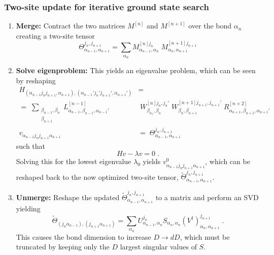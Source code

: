 \subsubsection{Two-site update for iterative ground state search}
\begin{enumerate}
\item
\textbf{Merge:} Contract the two matrices $M^{[n]}$ and $M^{[n+1]}$ over the bond $\alpha_{n}$ creating a two-site tensor
\begin{equation}
\Theta_{\alpha_{n-1} , \alpha_{n+1}}^{j_n , j_{n+1}} = \sum_{\alpha_n} M_{\alpha_{n-1} , \alpha_{n}}^{[n] j_n } \;  M_{\alpha_{n} , \alpha_{n+1}}^{[n+1] j_{n+1} } 
\end{equation}

\item
\textbf{Solve eigenproblem:} This yields an eigenvalue problem, which can be seen by reshaping
\begin{align}
	H_{( \alpha_{n-1}  j_n  j_{n+1}, \alpha_{n+1}),(\alpha_{n-1}'  j_n '  j_{n+1}', \alpha_{n+1}')} &= \nonumber \\
	= \; \sum_{\substack{\beta_{n-1} , \beta_n \\ \beta_{n+1}}} L_{\alpha_{n-1}, \beta_{n-1} , \alpha_{n-1} '}^{[n-1]} & \; W_{\beta_{n_1}, \beta_n}^{[n] j_n , j_n '} \; W_{\beta_{n}, \beta_{n+1}}^{[n+1] j_{n+1} , j_{n+1} '}\;  R_{\alpha_{n+1} ,\beta_{n+1} , \alpha_{n+1} '}^{[n+2]} \\
	v_{ \alpha_{n-1} j_n j_{n+1} \alpha_{n+1}} &= \; \Theta_{\alpha_{n-1} , \alpha_{n+1}}^{j_n , j_{n+1}}
\end{align}
such that
\begin{equation}
	H v - \lambda v = 0 \; .
	\label{eq:eigprob}
\end{equation}
Solving this for the lowest eigenvalue $\lambda_0$ yields $v_{ \alpha_{n-1} j_n j_{n+1} \alpha_{n+1}}^0$, which can be reshaped back to the now optimized two-site tensor, $\tilde{\Theta}_{\alpha_{n-1} , \alpha_{n+1}}^{j_n , j_{n+1}}$.

\item
\textbf{Unmerge:} Reshape the updated $\tilde{\Theta}_{\alpha_{n-1} , \alpha_{n+1}}^{j_n , j_{n+1}}$ to a matrix and perform an SVD yielding
\begin{equation}
	\tilde{\Theta}_{(j_n \alpha_{n-1} ) ,(j_{n+1}  \alpha_{n+1} )} = \sum_{\alpha_n} U_{\alpha_{n-1} , \alpha_{n}}^{j_n} S_{\alpha_n , \alpha_n} (V^{\dag})_{\alpha_{n} , \alpha_{n+1}}^{j_{n+1}} \; .
\end{equation}
This causes the bond dimension to increase $D \rightarrow d D$, which must be truncated by keeping only the $D$ largest singular values of $S$. 


\end{enumerate}
